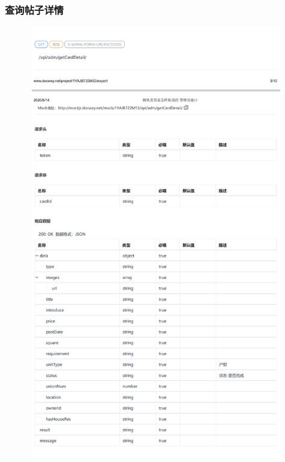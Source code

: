 \subsubsection{查询帖子详情}
\begin{figure}[h]
    \centering
    \includegraphics[height=19.0cm,width=14.0cm]{design/image/api36.png} 
    \end{figure}  
    \newpage
